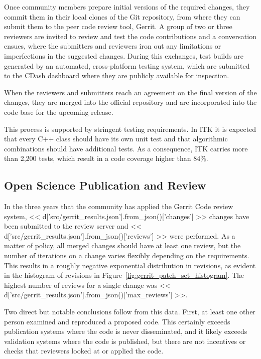 \documentclass{frontiersENG} %
\begin{document}
Once community members prepare initial versions of the required changes, they
commit them in their local clones of the Git repository, from where they can
submit them to the peer code review tool, Gerrit. A group of two or three reviewers
are invited to review and test the code contributions and a conversation
ensues, where the submitters and reviewers iron out any limitations or
imperfections in the suggested changes. During this exchanges, test builds are
generated by an automated, cross-platform testing system, which are submitted to the CDash
dashboard where they are publicly available for inspection.

When the reviewers and submitters reach an agreement on the final version of
the changes, they are merged into the official repository and are incorporated
into the code base for the upcoming release.

This process is supported by stringent testing requirements. In ITK it is
expected that every C++ class should have its own unit test and that
algorithmic combinations should have additional tests. As a consequence, ITK
carries more than 2,200 tests, which result in a code coverage higher than 84\%.



\subsection{Open Science Publication and Review}

In the three years that the community has applied the Gerrit Code review
system, << d['src/gerrit_results.json'].from_json()['changes'] >> changes have
been submitted to the review server and
<< d['src/gerrit_results.json'].from_json()['reviews'] >> were performed.
As a matter of policy, all merged changes should have at least one review,
but the number of iterations on a change varies flexibly depending on the
requirements. This results in a roughly negative exponential distribution in
revisions, as evident in the histogram of revisions in
Figure~\ref{fig:gerrit_patch_set_histogram}.  The highest number of reviews
for a single change was
<< d['src/gerrit_results.json'].from_json()['max_reviews'] >>.

Two direct but notable conclusions follow from this data. First, at least one
other person examined and reproduced a proposed code.  This certainly exceeds
publication systems where the code is never disseminated, and it likely
exceeds validation systems where the code is published, but there are not
incentives or checks that reviewers looked at or applied the code.
\end{document}

